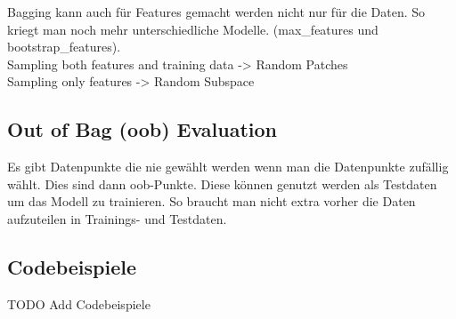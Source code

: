 Bagging kann auch für Features gemacht werden nicht nur für die Daten. So kriegt man noch mehr unterschiedliche Modelle. (max\_features und bootstrap\_features).\\
Sampling both features and training data -> Random Patches\\
Sampling only features -> Random Subspace\\
\subsection{Out of Bag (oob) Evaluation}
Es gibt Datenpunkte die nie gewählt werden wenn man die Datenpunkte zufällig wählt. Dies sind dann oob-Punkte. Diese können genutzt werden als Testdaten um das Modell zu trainieren. So braucht man nicht extra vorher die Daten aufzuteilen in Trainings- und Testdaten.
\subsection{Codebeispiele}
TODO Add Codebeispiele
